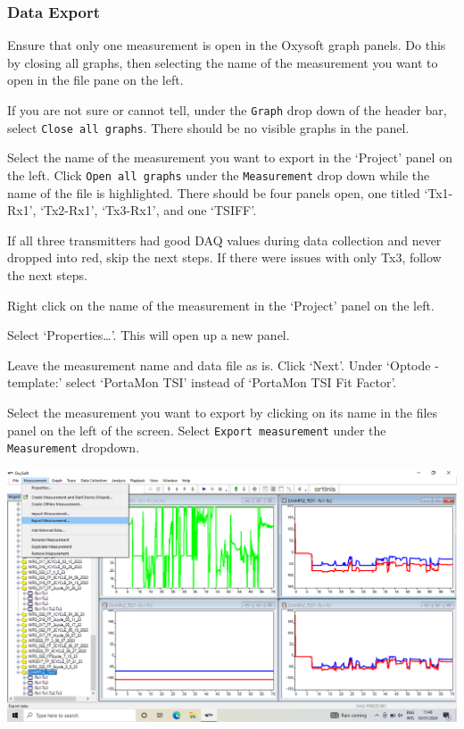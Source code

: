 \documentclass[
]{book}
\begin{document}
\hypertarget{Appendix-Instruments-PortaMon-Usage-DataExport}{%
\subsubsection{Data Export}\label{Appendix-Instruments-PortaMon-Usage-DataExport}}

Ensure that only one measurement is open in the Oxysoft graph panels. Do this by closing all graphs, then selecting the name of the measurement you want to open in the file pane on the left.

If you are not sure or cannot tell, under the \texttt{Graph} drop down of the header bar, select \texttt{Close\ all\ graphs}. There should be no visible graphs in the panel.

Select the name of the measurement you want to export in the `Project' panel on the left. Click \texttt{Open\ all\ graphs} under the \texttt{Measurement} drop down while the name of the file is highlighted. There should be four panels open, one titled `Tx1-Rx1', `Tx2-Rx1', `Tx3-Rx1', and one `TSIFF'.

If all three transmitters had good DAQ values during data collection and never dropped into red, skip the next steps. If there were issues with only Tx3, follow the next steps.

Right click on the name of the measurement in the `Project' panel on the left.

Select `Properties\ldots{}'. This will open up a new panel.

Leave the measurement name and data file as is. Click `Next'. Under `Optode -template:' select `PortaMon TSI' instead of `PortaMon TSI Fit Factor'.

Select the measurement you want to export by clicking on its name in the files panel on the left of the screen. Select \texttt{Export\ measurement} under the \texttt{Measurement} dropdown.

\includegraphics[width=1\linewidth]{images/exportmeasurement/1_selectmeasurementtoexport}
\end{document}
